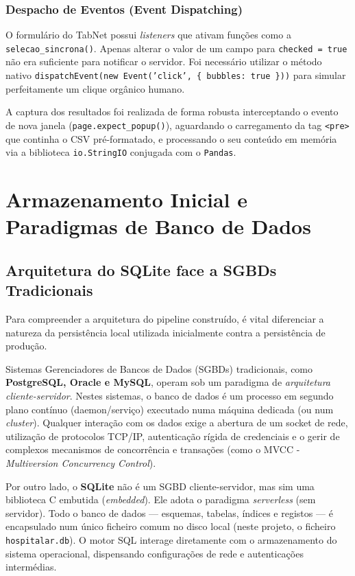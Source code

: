 \documentclass[12pt,a4paper]{report}
\begin{document}
\subsection{Despacho de Eventos (Event Dispatching)}
O formulário do TabNet possui \textit{listeners} que ativam funções como a \texttt{selecao\_sincrona()}. Apenas alterar o valor de um campo para \texttt{checked = true} não era suficiente para notificar o servidor. Foi necessário utilizar o método nativo \texttt{dispatchEvent(new Event('click', \{ bubbles: true \}))} para simular perfeitamente um clique orgânico humano.

A captura dos resultados foi realizada de forma robusta interceptando o evento de nova janela (\texttt{page.expect\_popup()}), aguardando o carregamento da tag \texttt{<pre>} que continha o CSV pré-formatado, e processando o seu conteúdo em memória via a biblioteca \texttt{io.StringIO} conjugada com o \texttt{Pandas}.

\chapter{Armazenamento Inicial e Paradigmas de Banco de Dados}

\section{Arquitetura do SQLite face a SGBDs Tradicionais}
Para compreender a arquitetura do pipeline construído, é vital diferenciar a natureza da persistência local utilizada inicialmente contra a persistência de produção.

Sistemas Gerenciadores de Bancos de Dados (SGBDs) tradicionais, como \textbf{PostgreSQL, Oracle e MySQL}, operam sob um paradigma de \textit{arquitetura cliente-servidor}. Nestes sistemas, o banco de dados é um processo em segundo plano contínuo (daemon/serviço) executado numa máquina dedicada (ou num \textit{cluster}). Qualquer interação com os dados exige a abertura de um socket de rede, utilização de protocolos TCP/IP, autenticação rígida de credenciais e o gerir de complexos mecanismos de concorrência e transações (como o MVCC - \textit{Multiversion Concurrency Control}).

Por outro lado, o \textbf{SQLite} não é um SGBD cliente-servidor, mas sim uma biblioteca C embutida (\textit{embedded}). Ele adota o paradigma \textit{serverless} (sem servidor). Todo o banco de dados — esquemas, tabelas, índices e registos — é encapsulado num único ficheiro comum no disco local (neste projeto, o ficheiro \texttt{hospitalar.db}). O motor SQL interage diretamente com o armazenamento do sistema operacional, dispensando configurações de rede e autenticações intermédias.
\end{document}
